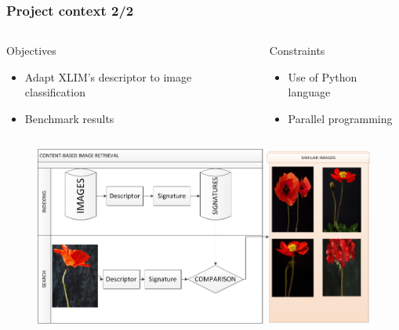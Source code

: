 \documentclass[xcolor=table]{beamer}
\begin{document}
\begin{frame} \frametitle{Project context 2/2}
\begin{columns}[t]
  \begin{column}{5cm}
  \begin{block}{Objectives}

    \begin{itemize}
        \item Adapt XLIM's descriptor to image classification
        \item Benchmark results
    \end{itemize}
\end{block}
  \end{column}

  \begin{column}{5cm}
 \begin{alertblock}{Constraints}
    \begin{itemize}
        \item Use of Python language
        \item Parallel programming
    \end{itemize}
\end{alertblock}
  \end{column}
\end{columns}

\begin{figure}
    \includegraphics[scale=0.34]{CBIR.png}
\end{figure}

\end{frame}
\end{document}
